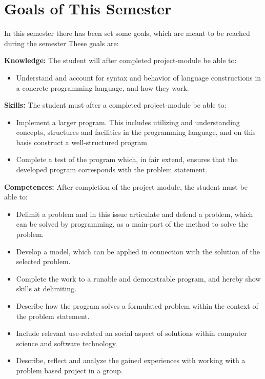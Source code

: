 


\section{Goals of This Semester}
In this semester there has been set some goals, which are meant to be reached during the semester These goals are: 

\textbf{Knowledge:} \newline
	The student will after completed project-module be able to:
	\begin{itemize}
			\item Understand and account for syntax and behavior of language constructions in a concrete programming language, and how they work.
	\end{itemize}

\textbf{Skills:} \newline
	The student must after a completed project-module be able to:
	\begin{itemize}
		\item Implement a larger program. This includes utilizing and understanding concepts, structures and facilities in the programming language, and on this basis construct a well-structured program
		\item Complete a test of the program which, in fair extend, ensures that the developed program corresponds with the problem statement. 
	\end{itemize}

\textbf{Competences:} \newline
	After completion of the project-module, the student must be able to:
	\begin{itemize}
		\item Delimit a problem and in this issue articulate and defend a problem, which can be solved by programming, as a main-part of the method to 		solve the problem.	
		\item Develop a model, which can be applied in connection with the solution of the selected problem. 
		\item Complete the work to a runable and demonstrable program, and hereby show skills at delimiting. 
		\item Describe how the program solves a formulated problem within the context of the problem statement. 
		\item Include relevant use-related an social aspect of solutions within computer science and software technology.
		\item Describe, reflect and analyze the gained experiences with working with a problem based project in a group.
	\end{itemize}

